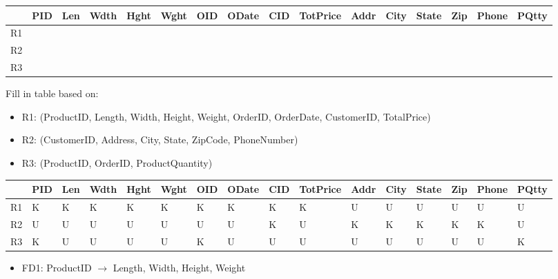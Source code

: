 \documentclass[a4paper]{article}
\begin{document}
\begin{table}[htb]
\begin{tabular}{|l|l|l|l|l|l|l|l|l|l|l|l|l|l|l|l|}
\hline
   & PID & Len & Wdth & Hght & Wght & OID & ODate & CID & TotPrice & Addr & City & State & Zip & Phone & PQtty \\ \hline
R1 &     &     &      &      &      &     &       &     &          &      &      &       &     &       &       \\ \hline
R2 &     &     &      &      &      &     &       &     &          &      &      &       &     &       &       \\ \hline
R3 &     &     &      &      &      &     &       &     &          &      &      &       &     &       &       \\ \hline
\end{tabular}
\end{table}

Fill in table based on:
\begin{itemize}
    \item R1: (ProductID, Length, Width, Height, Weight, OrderID, OrderDate, CustomerID, TotalPrice)
    \item R2: (CustomerID, Address, City, State, ZipCode, PhoneNumber)
    \item R3: (ProductID, OrderID, ProductQuantity)
\end{itemize}

\begin{table}[htb]
\begin{tabular}{|l|l|l|l|l|l|l|l|l|l|l|l|l|l|l|l|}
\hline
   & PID & Len & Wdth & Hght & Wght & OID & ODate & CID & TotPrice & Addr & City & State & Zip & Phone & PQtty \\ \hline
R1 & K   & K   & K    & K    & K    & K   & K     & K   & K        & U    & U    & U     & U   & U     & U     \\ \hline
R2 & U   & U   & U    & U    & U    & U   & U     & K   & U        & K    & K    & K     & K   & K     & U     \\ \hline
R3 & K   & U   & U    & U    & U    & K   & U     & U   & U        & U    & U    & U     & U   & U     & K     \\ \hline
\end{tabular}
\end{table}

\begin{itemize}
    \item FD1: ProductID $\rightarrow$ Length, Width, Height, Weight
\end{itemize}
\end{document}
